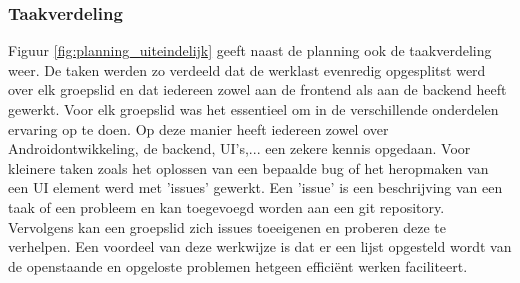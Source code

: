 \subsubsection{Taakverdeling}

Figuur \ref{fig:planning_uiteindelijk} geeft naast de planning ook de taakverdeling weer. De taken werden zo verdeeld dat de werklast evenredig opgesplitst werd over elk groepslid en dat iedereen zowel aan de frontend als aan de backend heeft gewerkt. Voor elk groepslid was het essentieel om in de verschillende onderdelen ervaring op te doen. Op deze manier heeft iedereen zowel over Androidontwikkeling, de backend, UI's,... een zekere kennis opgedaan. Voor kleinere taken zoals het oplossen van een bepaalde bug of het heropmaken van een UI element werd met 'issues' gewerkt. Een 'issue' is een beschrijving van een taak of een probleem en kan toegevoegd worden aan een git repository. Vervolgens kan een groepslid zich issues toeeigenen en proberen deze te verhelpen. Een voordeel van deze werkwijze is dat er een lijst opgesteld wordt van de openstaande en opgeloste problemen hetgeen efficiënt werken faciliteert.

